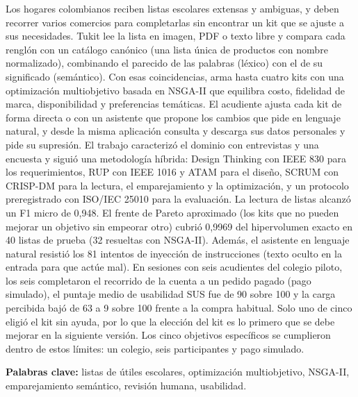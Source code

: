\vspace{0.25cm}

Los hogares colombianos reciben listas escolares extensas y ambiguas, y deben recorrer
varios comercios para completarlas sin encontrar un kit que se ajuste a sus necesidades.
Tukit lee la lista en imagen, PDF o texto libre y compara cada renglón con un catálogo
canónico (una lista única de productos con nombre normalizado), combinando el parecido de las palabras (léxico)
con el de su significado (semántico). Con esas coincidencias, arma hasta cuatro kits con una optimización
multiobjetivo basada en NSGA-II que equilibra costo, fidelidad de marca, disponibilidad y
preferencias temáticas. El acudiente ajusta cada kit de forma directa o con un asistente que propone los cambios que pide en lenguaje natural, y desde la misma aplicación consulta y descarga sus datos personales y pide su supresión. El trabajo caracterizó el dominio con entrevistas y una encuesta y siguió una metodología híbrida: Design Thinking con IEEE 830 para los requerimientos, RUP con IEEE 1016 y ATAM para el diseño, SCRUM con CRISP-DM para la lectura, el emparejamiento y la optimización, y un protocolo preregistrado con ISO/IEC 25010 para la evaluación. La
lectura de listas alcanzó un F1 micro de 0,948. El frente de Pareto aproximado (los kits que no pueden mejorar un objetivo sin empeorar otro) cubrió 0,9969
del hipervolumen exacto en 40 listas de prueba (32 resueltas con NSGA-II). Además, el asistente en lenguaje natural resistió los 81 intentos de inyección de instrucciones (texto oculto en la entrada para que actúe mal). En sesiones con seis acudientes del colegio piloto, los seis completaron
el recorrido de la cuenta a un pedido pagado (pago simulado), el puntaje medio de usabilidad SUS fue de 90 sobre 100 y la carga
percibida bajó de 63 a 9 sobre 100 frente a la compra habitual. Solo uno de cinco eligió el kit sin
ayuda, por lo que la elección del kit es lo primero que se debe mejorar en la siguiente versión. Los cinco objetivos específicos se cumplieron dentro de estos límites: un colegio, seis participantes y pago simulado.

\vspace{0.2cm}
\noindent\textbf{Palabras clave:} listas de útiles escolares, optimización multiobjetivo,
NSGA-II, emparejamiento semántico, revisión humana, usabilidad.